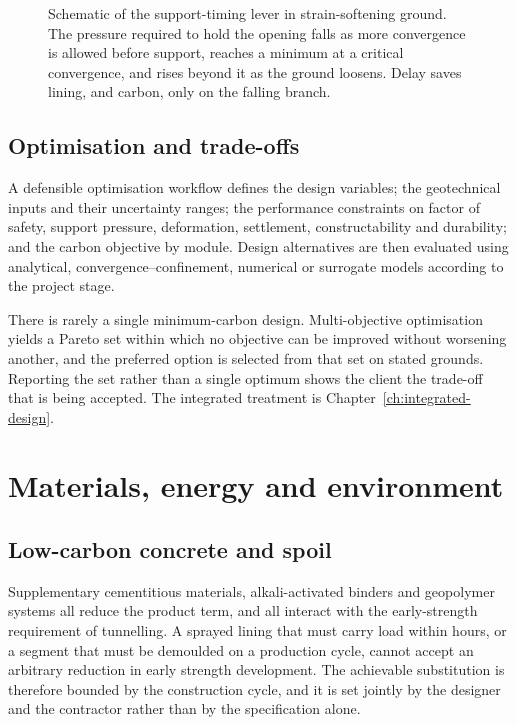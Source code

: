 \begin{figure}[htbp]
\centering
{}
\caption{Schematic of the support-timing lever in strain-softening ground.
The pressure required to hold the opening falls as more convergence is allowed
before support, reaches a minimum at a critical convergence, and rises beyond
it as the ground loosens. Delay saves lining, and carbon, only on the falling
branch.}
\label{fig:sus-support-timing}
\end{figure}

\subsection{Optimisation and trade-offs}
\label{sec:carbon-optimisation}

A defensible optimisation workflow defines the design variables; the
geotechnical inputs and their uncertainty ranges; the performance constraints
on factor of safety, support pressure, deformation, settlement,
constructability and durability; and the carbon objective by module. Design
alternatives are then evaluated using analytical, convergence--confinement,
numerical or surrogate models according to the project stage.

There is rarely a single minimum-carbon design. Multi-objective optimisation
yields a Pareto set within which no objective can be improved without
worsening another, and the preferred option is selected from that set on
stated grounds. Reporting the set rather than a single optimum shows
the client the trade-off that is being
accepted. The integrated treatment is Chapter~\ref{ch:integrated-design}.

\section{Materials, energy and environment}
\label{sec:materials-energy-environment}

\subsection{Low-carbon concrete and spoil}
\label{sec:materials-spoil}

Supplementary cementitious materials, alkali-activated binders and geopolymer
systems all reduce the product term, and all interact with the early-strength
requirement of tunnelling. A sprayed lining that must carry load
within hours, or a segment that must be demoulded on a production cycle,
cannot accept an arbitrary reduction in early strength development. The
achievable substitution is therefore bounded by the construction cycle, and it
is set jointly by the designer and the contractor rather than by the
specification alone.

